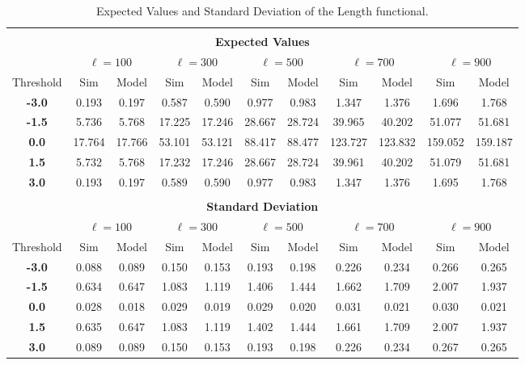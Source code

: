\documentclass[aps,prd,showpacs,superscriptaddress,groupedaddress]{revtex4-1}  %
\begin{document}
\begin{table}
\centering
\begin{tabular}{|c||c|c|c|c|c|c|c|c|c|c|}

\multicolumn{11}{c}{} \\ 
\multicolumn{11}{c}{\textbf{Expected Values}} \\ 
\hline 
& \multicolumn{2}{c|}{$\ell=100$} & \multicolumn{2}{c|}{$\ell=300$} & \multicolumn{2}{c|}{$\ell=500$} & \multicolumn{2}{c|}{$\ell=700$} & \multicolumn{2}{c|}{$\ell=900$}\\ 
 \hline
Threshold & Sim & Model & Sim & Model & Sim & Model & Sim & Model & Sim & Model\\ 
 \hline
\textbf{-3.0} & 0.193 & 0.197 & 0.587 & 0.590 & 0.977 & 0.983 & 1.347 & 1.376 & 1.696 & 1.768\\
\textbf{-1.5} & 5.736 & 5.768 & 17.225 & 17.246 & 28.667 & 28.724 & 39.965 & 40.202 & 51.077 & 51.681\\
\textbf{0.0} & 17.764 & 17.766 & 53.101 & 53.121 & 88.417 & 88.477 & 123.727 & 123.832 & 159.052 & 159.187\\
\textbf{1.5} & 5.732 & 5.768 & 17.232 & 17.246 & 28.667 & 28.724 & 39.961 & 40.202 & 51.079 & 51.681\\
\textbf{3.0} & 0.193 & 0.197 & 0.589 & 0.590 & 0.977 & 0.983 & 1.347 & 1.376 & 1.695 & 1.768\\


\hline 
\multicolumn{11}{c}{} \\ 
\multicolumn{11}{c}{\textbf{Standard Deviation}} \\ 
\hline 
& \multicolumn{2}{c|}{$\ell=100$} & \multicolumn{2}{c|}{$\ell=300$} & \multicolumn{2}{c|}{$\ell=500$} & \multicolumn{2}{c|}{$\ell=700$} & \multicolumn{2}{c|}{$\ell=900$}\\ 
 \hline
Threshold & Sim & Model & Sim & Model & Sim & Model & Sim & Model & Sim & Model\\ 
 \hline
\textbf{-3.0} & 0.088 & 0.089 & 0.150 & 0.153 & 0.193 & 0.198 & 0.226 & 0.234 & 0.266 & 0.265\\
\textbf{-1.5} & 0.634 & 0.647 & 1.083 & 1.119 & 1.406 & 1.444 & 1.662 & 1.709 & 2.007 & 1.937\\
\textbf{0.0} & 0.028 & 0.018 & 0.029 & 0.019 & 0.029 & 0.020 & 0.031 & 0.021 & 0.030 & 0.021\\
\textbf{1.5} & 0.635 & 0.647 & 1.083 & 1.119 & 1.402 & 1.444 & 1.661 & 1.709 & 2.007 & 1.937\\
\textbf{3.0} & 0.089 & 0.089 & 0.150 & 0.153 & 0.193 & 0.198 & 0.226 & 0.234 & 0.267 & 0.265\\

\hline 
\end{tabular} \\
\caption{Expected Values and Standard Deviation of the Length functional.} \\
\label{tab:length_mean_rms} \\
\end{table}
\end{document}
